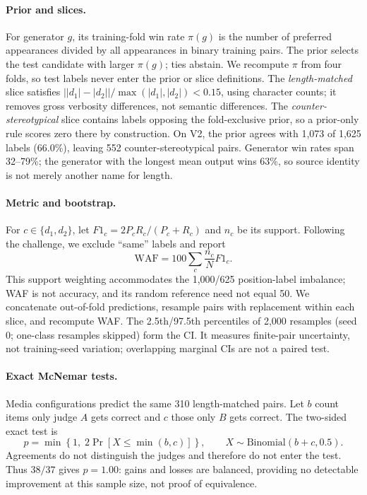 \paragraph{Prior and slices.}
For generator $g$, its training-fold win rate $\pi(g)$ is the number of preferred appearances divided by all appearances in binary training pairs. The prior selects the test candidate with larger $\pi(g)$; ties abstain. We recompute $\pi$ from four folds, so test labels never enter the prior or slice definitions. The \emph{length-matched} slice satisfies $\lvert |d_1|-|d_2|\rvert/\max(|d_1|,|d_2|)<0.15$, using character counts; it removes gross verbosity differences, not semantic differences. The \emph{counter-stereotypical} slice contains labels opposing the fold-exclusive prior, so a prior-only rule scores zero there by construction.
On V2, the prior agrees with 1,073 of 1,625 labels (66.0\%), leaving 552 counter-stereotypical pairs. Generator win rates span 32--79\%; the generator with the longest mean output wins 63\%, so source identity is not merely another name for length.

\paragraph{Metric and bootstrap.}
For $c\in\{d_1,d_2\}$, let $F1_c=2P_cR_c/(P_c+R_c)$ and $n_c$ be its support. Following the challenge, we exclude ``same'' labels and report
\begin{equation*}
  \mathrm{WAF}=100\sum_c \frac{n_c}{N}F1_c.
\end{equation*}
This support weighting accommodates the 1,000/625 position-label imbalance; WAF is not accuracy, and its random reference need not equal 50. We concatenate out-of-fold predictions, resample pairs with replacement within each slice, and recompute WAF. The 2.5th/97.5th percentiles of 2,000 resamples (seed 0; one-class resamples skipped) form the CI. It measures finite-pair uncertainty, not training-seed variation; overlapping marginal CIs are not a paired test.

\paragraph{Exact McNemar tests.}
Media configurations predict the same 310 length-matched pairs. Let $b$ count items only judge $A$ gets correct and $c$ those only $B$ gets correct. The two-sided exact test is
\begin{equation*}
  p=\min\!\left\{1,\;2\Pr\!\left[X\leq \min(b,c)\right]\right\},
  \qquad X\sim\mathrm{Binomial}(b+c,0.5).
\end{equation*}
Agreements do not distinguish the judges and therefore do not enter the test. Thus $38/37$ gives $p=1.00$: gains and losses are balanced, providing no detectable improvement at this sample size, not proof of equivalence.


